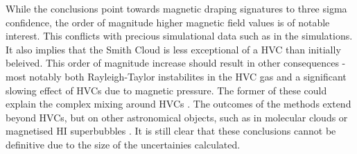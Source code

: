 While the conclusions point towards magnetic draping signatures to three sigma confidence, the order of magnitude higher magnetic field values is of notable interest. This conflicts with precious simulational data such as in the \citeauthor{ID23} simulations. It also implies that the Smith Cloud is less exceptional of a HVC than initially beleived. This order of magnitude increase should result in other consequences - most notably both Rayleigh-Taylor instabilites in the HVC gas and a significant slowing effect of HVCs due to magnetic pressure. The former of these could explain the complex mixing around HVCs \citep{ID67}. The outcomes of the methods extend beyond HVCs, but on other astronomical objects, such as in molecular clouds or magnetised HI superbubbles \citep{ID70,ID75}. It is still clear that these conclusions cannot be definitive due to the size of the uncertainies calculated.